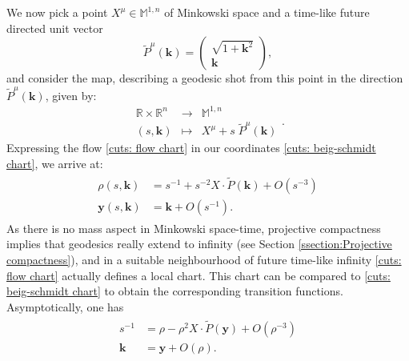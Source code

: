 \documentclass[a4paper, 10pt]{article}
\theoremstyle{remark}
\newcommand{\badat}{\begin{alignedat}}
\newcommand{\eadat}{\end{alignedat}}
\newcommand{\scal}{\cdot} %
\begin{document}
We now pick a point $X^{\mu} \in \mathbb{M}^{1,n}$ of Minkowski space and a time-like future directed unit vector
\begin{equation}\label{cuts: beig-schmidt chart on momenta}
  \tilde{P}^{\mu}(\bm{k}) = \begin{pmatrix}
        \sqrt{1 + \bm{k}^2}\\ \bm{k}
    \end{pmatrix},
\end{equation}
 and consider the map, describing a geodesic shot from this point in the direction $\tilde{P}^{\mu}(\bm{k})$, given by:
\begin{equation}\label{cuts: flow chart}
    \begin{array}{ccc}
        \mathbb{R} \times \mathbb{R}^n  & \to & \mathbb{M}^{1,n}  \\[0.2em]
         (s, \bm{k}) & \mapsto  & X^{\mu} + s\; \tilde{P}^{\mu}(\bm{k})
    \end{array}.
\end{equation}
Expressing the flow \eqref{cuts: flow chart} in our coordinates \eqref{cuts: beig-schmidt chart}, we arrive at:
\begin{align}
\badat{2}
    \rho(s, \bm{k})  &= s^{-1} + s^{-2} X \scal \tilde{P}(\bm{k}) + O(s^{-3}) \\
    \bm{y}(s, \bm{k}) &= \bm{k} + O(s^{-1}).
    \eadat
\end{align}
As there is no mass aspect in Minkowski space-time, projective compactness implies that geodesics really extend to infinity (see Section \ref{ssection:Projective compactness}), and in a suitable neighbourhood of future time-like infinity \eqref{cuts: flow chart} actually defines a local chart. This chart can be compared to \eqref{cuts: beig-schmidt chart} to obtain the corresponding transition functions. Asymptotically, one has
\begin{align}
\badat{2}
    s^{-1}  &= \rho - \rho^2 X \scal \tilde{P}(\bm{y}) + O(\rho^{-3}) \\
    \bm{k}  &= \bm{y} + O(\rho).
    \eadat
\end{align}
\end{document}
